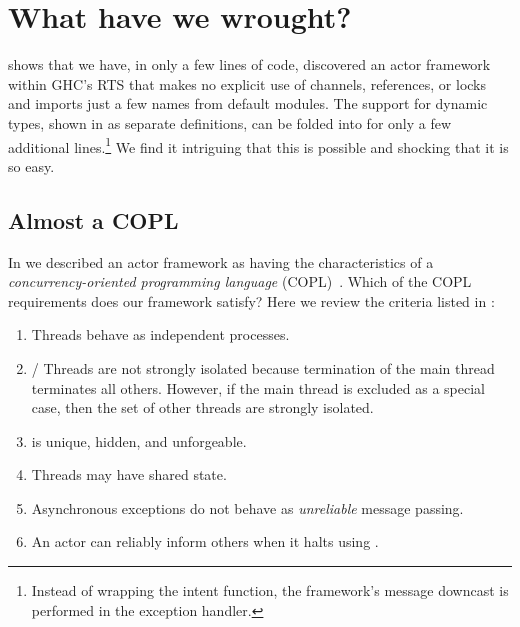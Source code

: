 \documentclass[sigplan,screen]{acmart}
\begin{document}
\section{What have we wrought?}
\label{sec:what-have-we-wrought}

 shows that we have, in only a few lines of
code, discovered an actor framework within GHC's RTS that makes no explicit use
of channels, references, or locks and imports just a few names from default
modules.
%
The support for dynamic types, shown in  as separate
definitions, can be folded into  for only a few
additional lines.\footnote{
    Instead of wrapping the intent function, the framework's message downcast
    is performed in the exception handler.
}
%
We find it intriguing that this is possible and shocking that it is so easy.

\subsection{Almost a COPL}
\label{sec:almost-copl}

In  we described an actor framework as having the
characteristics of a \emph{concurrency-oriented programming language}
(COPL)~\citep{armstrong2003}.
%
Which of the COPL requirements does our framework satisfy?
%
Here we review the criteria listed in :
%
%
\begin{enumerate}[leftmargin=2em]
    \item {} Threads behave as independent processes.
    \item {}/ Threads are not strongly isolated because
    termination of the main thread terminates all others. However, if the main
    thread is excluded as a special case, then the set of other threads are
    strongly isolated.
    \item {}  is unique, hidden, and unforgeable.
    \item {} Threads may have shared state.
    \item {} Asynchronous exceptions do not behave as \emph{unreliable} message passing.
    \item {} An actor can reliably inform others when it halts using
    .
\end{enumerate}
\end{document}
